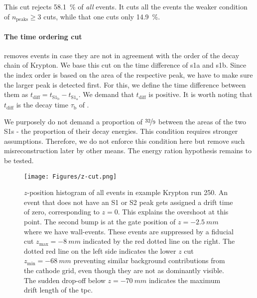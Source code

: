 This cut rejects \SI{58.1}{\%} of \emph{all} events. %
It cuts all the events the weaker condition of $ n_\mathrm{peaks} \ge 3 $ cuts, while that one cuts only \SI{14.9}{\%}.


\paragraph{The time ordering cut} removes events in case they are not in agreement with the order of the decay chain of Krypton.
We base this cut on the time difference of \gls{s1a} and \gls{s1b}.
Since the index order is based on the area of the respective peak, we have to make sure the larger peak is detected first.
For this, we define the time difference between them as $t_\mathrm{diff} = t_{\mathrm{S}1_\mathrm{b}} - t_{\mathrm{S}1_\mathrm{a}}$.
We demand that $t_\mathrm{diff}$ is positive.
It is worth noting that $t_\mathrm{diff}$ is the decay time $\tau_\mathrm{b}$ of . %

We purposely do not demand a proportion of $ \nicefrac{32}{9} $ between the areas of the two S1s - the proportion of their decay energies.
This condition requires stronger assumptions.
Therefore, we do not enforce this condition here but remove such misreconstruction later by other means.
The energy ration hypothesis remains to be tested.

\begin{figure}[H]
    \centering
    \texttt{[image: Figures/z-cut.png]}  %
    \caption[Fiducial $ z $-cut]{
        $ z $-position histogram of all events in example Krypton run 250.
    An event that does not have an S1 or S2 peak gets assigned a drift time of zero, corresponding to $ z = 0 $.
    This explains the overshoot at this point.
    The second bump is at the gate position of $ z = \SI{-2.5}{mm}$ where we have wall-events.
    These events are suppressed by a fiducial cut $ z_\mathrm{max} = \SI{-8}{mm}$ indicated by the red dotted line on the right.
    The dotted red line on the left side indicates the lower $z$ cut $ z_\mathrm{min} = \SI{-68}{mm}$ preventing similar background contributions from the cathode grid,
    even though they are not as dominantly visible.
    The sudden drop-off below $ z = \SI{-70}{mm}$ indicates the maximum drift length of the \gls{tpc}.
    }
    \label{fig:fid-z-cut}
\end{figure}

